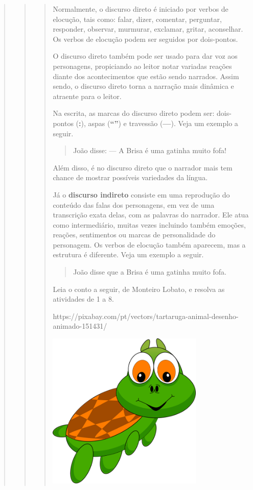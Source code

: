 \begin{boxlist}
{{\begin{quote}
\begin{quote}
\begin{quote}
{Normalmente, o discurso direto é iniciado por verbos de elocução, tais como: falar,
dizer, comentar, perguntar, responder, observar, murmurar, exclamar,
gritar, aconselhar. Os verbos de elocução podem ser seguidos por dois-pontos.

O discurso direto também pode ser usado para dar voz aos personagens,
propiciando ao leitor notar variadas reações diante dos acontecimentos
que estão sendo narrados. Assim sendo, o discurso direto torna a
narração mais dinâmica e atraente para o leitor.

Na escrita, as marcas do discurso direto podem ser: dois-pontos (\textbf{:}),
aspas (\textbf{``''}) e travessão (\textbf{---}). Veja um exemplo a seguir.

\begin{quote}
João disse:
--- A Brisa é uma gatinha muito fofa!
\end{quote}

Além disso, é no discurso direto que o narrador mais tem chance de mostrar
possíveis variedades da língua.

Já o \textbf{discurso indireto} consiste em uma reprodução do conteúdo das falas dos
personagens, em vez de uma transcrição exata delas, com as palavras do
narrador. Ele atua como intermediário, muitas vezes incluindo também
emoções, reações, sentimentos ou marcas de personalidade do personagem.
Os verbos de elocução também aparecem, mas a estrutura é diferente.
Veja um exemplo a seguir.

\begin{quote}
João disse que a Brisa é uma gatinha muito fofa.
\end{quote}



Leia o conto a seguir, de Monteiro Lobato, e resolva as atividades de 1 a 8.

https://pixabay.com/pt/vectors/tartaruga-animal-desenho-animado-151431/


\includegraphics[width=2.90902in,height=2.95828in]{media/image19.png}

}
\end{quote}
\end{quote}
\end{quote}}}
\end{boxlist}
